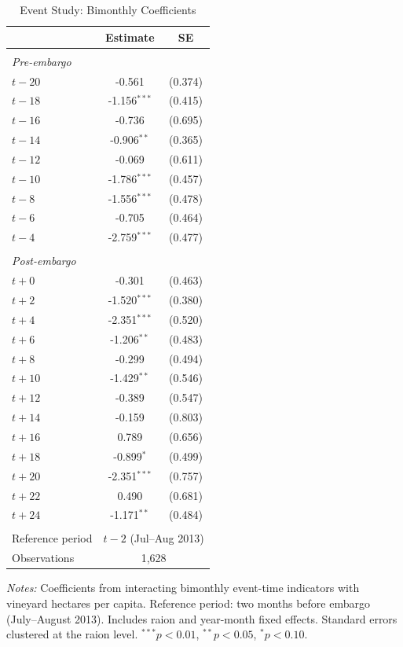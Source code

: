\begin{table}[t]
\centering
\caption{Event Study: Bimonthly Coefficients}
\label{tab:eventstudy}
\begin{tabular}{lcc}
\hline\hline
 & Estimate & SE \\
\hline
\\[-1em]
\textit{Pre-embargo} & & \\
$t-20$ & -0.561 & (0.374) \\
$t-18$ & -1.156$^{***}$ & (0.415) \\
$t-16$ & -0.736 & (0.695) \\
$t-14$ & -0.906$^{**}$ & (0.365) \\
$t-12$ & -0.069 & (0.611) \\
$t-10$ & -1.786$^{***}$ & (0.457) \\
$t-8$ & -1.556$^{***}$ & (0.478) \\
$t-6$ & -0.705 & (0.464) \\
$t-4$ & -2.759$^{***}$ & (0.477) \\
\\[-0.5em]
\textit{Post-embargo} & & \\
$t+0$ & -0.301 & (0.463) \\
$t+2$ & -1.520$^{***}$ & (0.380) \\
$t+4$ & -2.351$^{***}$ & (0.520) \\
$t+6$ & -1.206$^{**}$ & (0.483) \\
$t+8$ & -0.299 & (0.494) \\
$t+10$ & -1.429$^{**}$ & (0.546) \\
$t+12$ & -0.389 & (0.547) \\
$t+14$ & -0.159 & (0.803) \\
$t+16$ & 0.789 & (0.656) \\
$t+18$ & -0.899$^{*}$ & (0.499) \\
$t+20$ & -2.351$^{***}$ & (0.757) \\
$t+22$ & 0.490 & (0.681) \\
$t+24$ & -1.171$^{**}$ & (0.484) \\
\\[-0.5em]
\hline
Reference period & \multicolumn{2}{c}{$t-2$ (Jul--Aug 2013)} \\
Observations & \multicolumn{2}{c}{1,628} \\
\hline\hline
\end{tabular}
\begin{tablenotes}
\item \textit{Notes:} Coefficients from interacting bimonthly event-time indicators
with vineyard hectares per capita. Reference period: two months before embargo
(July--August 2013). Includes raion and year-month fixed effects.
Standard errors clustered at the raion level.
$^{***}p<0.01$, $^{**}p<0.05$, $^{*}p<0.10$.
\end{tablenotes}
\end{table}
